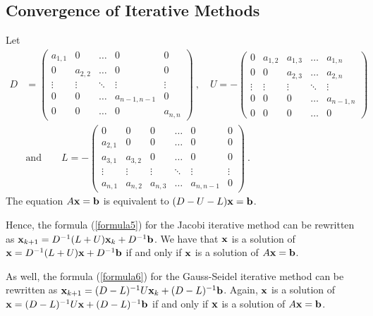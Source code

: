 \subsection{Convergence of Iterative Methods}
\label{conv_JGSIM}

Let
\begin{equation}\label{ADUL}
\begin{split}
D &= \begin{pmatrix}
a_{1,1} & 0 & \ldots & 0 & 0 \\
 0 & a_{2,2} & \ldots & 0 & 0 \\
\vdots & \vdots & \ddots & \vdots & \vdots \\
0 & 0 & \ldots & a_{n-1,n-1} & 0 \\
0 & 0 & \ldots & 0 & a_{n,n}
\end{pmatrix} \ , \quad
U = -\begin{pmatrix}
0 & a_{1,2} & a_{1,3} & \ldots  & a_{1,n} \\
0 & 0 & a_{2,3} & \ldots & a_{2,n} \\
\vdots & \vdots & \vdots & \ddots & \vdots \\
0 & 0 & 0 & \ldots & a_{n-1,n} \\
0 & 0 & 0 & \ldots & 0
\end{pmatrix} \\
&\text{and} \qquad L = -\begin{pmatrix}
0 & 0 & 0 &  \ldots & 0 & 0 \\
a_{2,1} & 0 & 0 & \ldots & 0 & 0 \\
a_{3,1} & a_{3,2} & 0 & \ldots & 0 & 0 \\
\vdots & \vdots & \vdots & \ddots & \vdots & \vdots \\
a_{n,1} & a_{n,2} & a_{n,3} & \ldots & a_{n,n-1} & 0
\end{pmatrix} \ .
\end{split}
\end{equation}
The equation $A\mathbf{x} = \mathbf{b}$ is equivalent to
$(D-U-L)\mathbf{x} = \mathbf{b}$.

Hence, the formula (\ref{formula5}) for the Jacobi iterative method
can be rewritten as
$\mathbf{x}_{k+1} = D^{-1}(L + U) \mathbf{x}_{k} + D^{-1}\mathbf{b}$.
We have that $\mathbf{x}$ is a solution of
$\mathbf{x} = D^{-1}(L + U) \mathbf{x} + D^{-1}\mathbf{b}$ if and only if
$\mathbf{x}$ is a solution of $A \mathbf{x} = \mathbf{b}$.

As well, the formula (\ref{formula6}) for the Gauss-Seidel iterative
method can be rewritten as
$\mathbf{x}_{k+1} = (D-L)^{-1} U \mathbf{x}_{k} + (D-L)^{-1}\mathbf{b}$.
Again, $\mathbf{x}$ is a solution of
$\mathbf{x} = (D-L)^{-1} U \mathbf{x} + (D-L)^{-1}\mathbf{b}$
if and only if $\mathbf{x}$ is a solution of $A \mathbf{x} = \mathbf{b}$.

